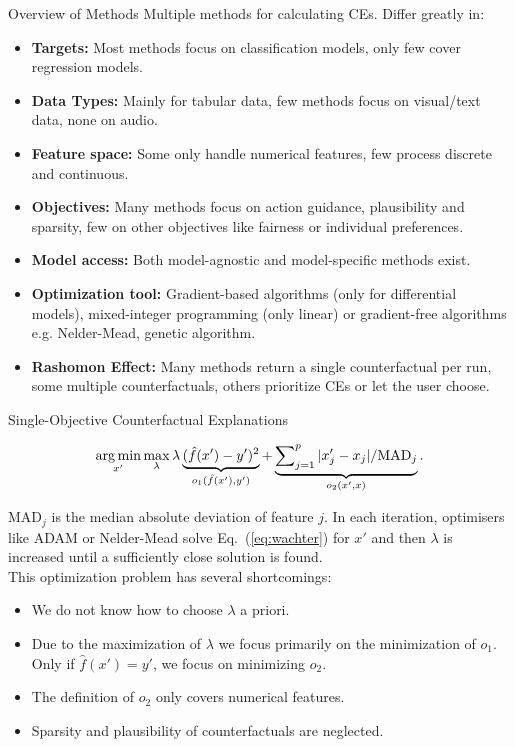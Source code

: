 \documentclass[aspectratio=169]{../latex_main/tntbeamer}  %
\begin{document}
\begin{frame}[c]{Overview of Methods}
	Multiple methods for calculating CEs. Differ greatly in: 
	\begin{itemize}
		\item \textbf{Targets:} Most methods focus on classification models, only few cover regression models. 
		\pause
		\item \textbf{Data Types:} Mainly for tabular data, few methods focus on visual/text data, none on audio.
		\pause
		\item \textbf{Feature space:} Some only handle numerical features, few process discrete and continuous. 
		\pause
		\item \textbf{Objectives:} Many methods focus on action guidance, plausibility and sparsity, few on other objectives like \alert{fairness or individual preferences}.
        \pause
		\item \textbf{Model access:} Both model-agnostic and model-specific methods exist.
		\pause
		\item \textbf{Optimization tool:} Gradient-based algorithms (only for differential models), mixed-integer programming (only linear) or gradient-free algorithms e.g. Nelder-Mead, genetic algorithm. 
		\pause
		\item \textbf{Rashomon Effect:} Many methods return a single counterfactual per run, some multiple counterfactuals, others prioritize CEs or let the user choose.
	\end{itemize}
\end{frame}

\begin{frame}[c]{Single-Objective Counterfactual Explanations }

	\begin{equation}
		\operatorname*{arg\,min}_{x'} \max_{\lambda} \lambda \underbrace{(\hat{f}(x') - y')^2}_{o_1(\hat{f}(x'), y')} + \underbrace{\sum\nolimits_{j = 1}^p |x'_j - x_j|/\text{MAD}_j}_{o_2(x', x)}.
		\label{eq:wachter}
	\end{equation}
	
	$\text{MAD}_j$ is the median absolute deviation of feature $j$. In each iteration, optimisers like ADAM or Nelder-Mead solve Eq.~(\ref{eq:wachter}) for $x'$ and then $\lambda$ is increased until a sufficiently close solution is found. \\[0.2cm]
	
	This optimization problem has several shortcomings: 	
	\begin{itemize}
		\item We do not know how to choose $\lambda$ a priori. 
		\item Due to the maximization of $\lambda$ we focus primarily on the minimization of $o_1$.\\
		Only if $\hat{f}(x') = y'$, we focus on minimizing $o_2$. 
		\item The definition of $o_2$ only covers numerical features. 
		\item Sparsity and plausibility of counterfactuals are neglected. 
	\end{itemize}

\end{frame}
\end{document}
